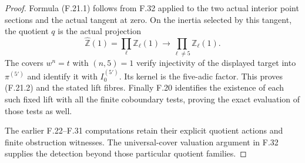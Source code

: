 \begin{proof}
Formula (F.21.1) follows from F.32 applied to the
two actual interior point sections and the
actual tangent at zero.
On the inertia selected by this tangent,
the quotient $q$ is the actual projection
\[
 \widehat{\mathbb Z}(1)
      =\prod_\ell\mathbb Z_\ell(1)
      \longrightarrow
        \prod_{\ell\ne5}\mathbb Z_\ell(1).
\]
The covers $w^n=t$ with $(n,5)=1$ verify
injectivity of the displayed target into
$\pi^{(5')}$ and identify it with
$I_0^{(5')}$.
Its kernel is the five-adic factor.
This proves (F.21.2) and the stated lift fibres.
Finally F.20 identifies the existence of each
such fixed lift with all the finite coboundary
tests, proving the exact evaluation of those
tests as well.

The earlier F.22--F.31 computations retain their
explicit quotient actions and finite obstruction
witnesses.  The universal-cover valuation
argument in F.32 supplies the detection beyond
those particular quotient families.
\end{proof}

